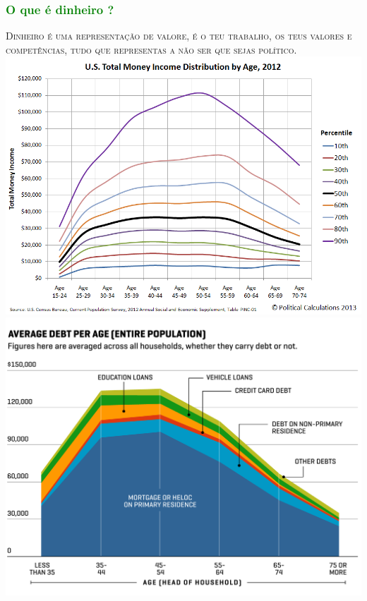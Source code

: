 \begin{frame}
\frametitle{\textcolor{green}{O que é dinheiro ?}}
\textsc{\large Dinheiro é uma representação de valore, é o teu trabalho, os teus valores e competências, tudo que representas a não ser que sejas político.}\\
\includegraphics[scale=0.2]{./image/Career_Path/Income_2012}\hspace{0.8cm}
\includegraphics[scale=0.125]{./image/Career_Path/Debt}
\end{frame}
